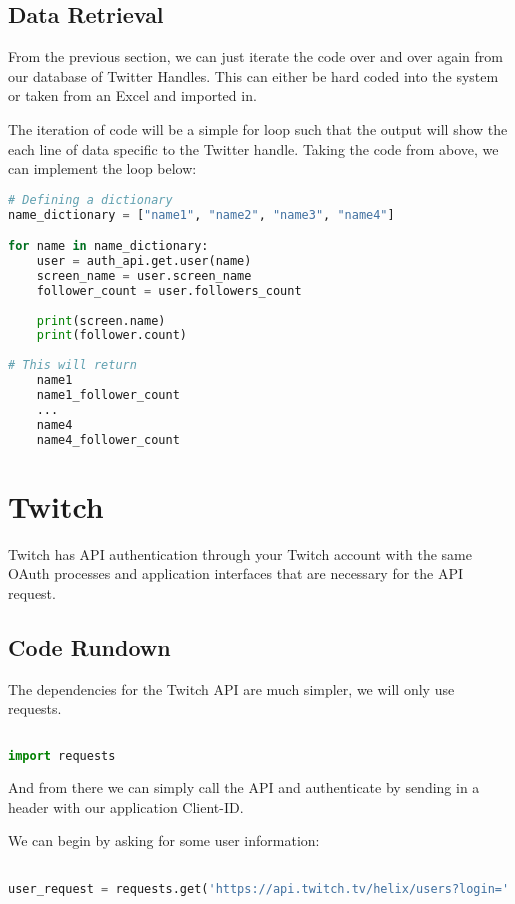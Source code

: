 \documentclass[12pt, letterpaper]{article}
\begin{document}
\subsection{Data Retrieval}
From the previous section, we can just iterate the code over and over again from our database of Twitter Handles. This can either be hard coded into the system or taken from an Excel and imported in.

The iteration of code will be a simple for loop such that the output will show the each line of data specific to the Twitter handle. Taking the code from above, we can implement the loop below:

\begin{lstlisting}[language=python]
# Defining a dictionary
name_dictionary = ["name1", "name2", "name3", "name4"]

for name in name_dictionary:
	user = auth_api.get.user(name)
	screen_name = user.screen_name
	follower_count = user.followers_count
	
	print(screen.name)
	print(follower.count)
	
# This will return
	name1
	name1_follower_count
	...
	name4
	name4_follower_count

\end{lstlisting}

\newpage
\section{Twitch}
Twitch has API authentication through your Twitch account with the same OAuth processes and application interfaces that are necessary for the API request.
\subsection{Code Rundown}
The dependencies for the Twitch API are much simpler, we will only use requests.
\begin{lstlisting}[language=python]

import requests

\end{lstlisting}
And from there we can simply call the API and authenticate by sending in a header with our application Client-ID.

We can begin by asking for some user information:
\begin{lstlisting}[language=python]

user_request = requests.get('https://api.twitch.tv/helix/users?login=' + user_name, headers={"Client-ID": "..."}


\end{lstlisting}
\end{document}
